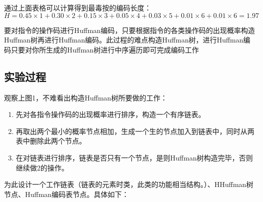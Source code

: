 \documentclass[UTF8,12pt]{article}
\begin{document}
通过上面表格可以计算得到最毒按的编码长度：
$$
H=0.45\times1+0.30\times2+0.15\times3+0.05\times4+0.03\times5+0.01\times6+0.01\times6=1.97
$$

要对指令的操作码进行Huffman编码，只要根据指令的各类操作码的出现概率构造Huffman树再进行Huffman编码。此过程的难点构造Huffman树，进行Huffman编码只要对你所生成的Huffman树进行中序遍历即可完成编码工作

\subsection{实验过程}
观察上图1，不难看出构造Huffman树所要做的工作：

\begin{enumerate}
    \item 先对各指令操作码的出现概率进行排序，构造一个有序链表。
    \item 再取出两个最小的概率节点相加，生成一个生的节点加入到链表中，同时从两表中删除此两个节点。
    \item 在对链表进行排序，链表是否只有一个节点，是则Huffman树构造完毕，否则继续做2的操作。
\end{enumerate}

\newpage

为此设计一个工作链表（链表的元素时类，此类的功能相当结构。）、HHuffman树节点、Huffman编码表节点。具体如下：
\end{document}
